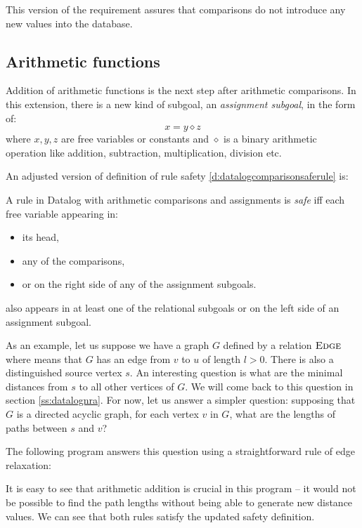 This version of the requirement assures that comparisons do not introduce any new values into the database.

\subsection{Arithmetic functions}

Addition of arithmetic functions is the next step after arithmetic comparisons. In this extension, there is a new kind of subgoal, an \emph{assignment subgoal}, in the form of:
$$x = y \diamond z$$
where $x, y, z$ are free variables or constants and $\diamond$ is a binary arithmetic operation like addition, subtraction, multiplication, division etc.


An adjusted version of definition of rule safety \ref{d:datalogcomparisonsaferule} is:

\begin{defn}\label{d:datalogeqsaferule}
A rule in Datalog with arithmetic comparisons and assignments is \emph{safe} iff each free variable appearing in:
\begin{itemize}
\item its head,
\item any of the comparisons,
\item or on the right side of any of the assignment subgoals.
\end{itemize}
also appears in at least one of the relational subgoals or on the left side of an assignment subgoal. 
\end{defn}

\begin{exmp}

As an example, let us suppose we have a graph $G$ defined by a relation $\textsc{Edge}$ 
where  means that $G$ has an edge from $v$ to $u$ of length $l > 0$. 
There is also a distinguished source vertex $s$.
An interesting question is what are the minimal distances from $s$ to all other vertices of $G$.
We will come back to this question in section \ref{ss:datalognra}.
For now, let us answer a simpler question: supposing that $G$ is a directed acyclic graph, for each vertex $v$ in $G$,
what are the lengths of paths between $s$ and $v$?

The following program answers this question using a straightforward rule of edge relaxation:


It is easy to see that arithmetic addition is crucial in this program -- it would not be possible to find the path lengths without being able to generate new distance values. We can see that both rules satisfy the updated safety definition.
\end{exmp}

